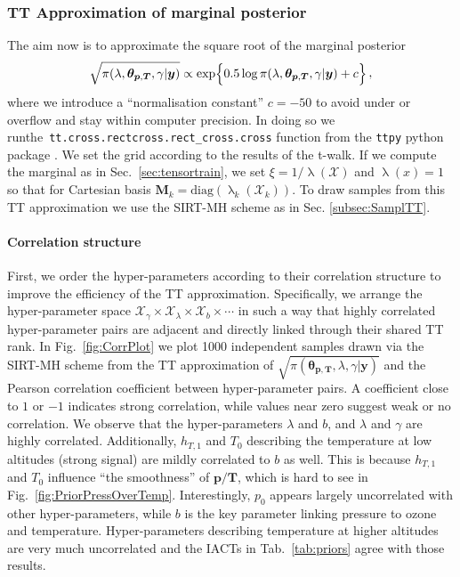 \subsubsection{TT Approximation of marginal posterior}
The aim now is to approximate the square root of the marginal posterior
\begin{align}
	\begin{split}
		\sqrt{\pi( \lambda,\bm{\theta}_{\bm{p}, \bm{T}},\gamma  | \bm{y})} \propto  \exp\Bigl\{ 0.5\log{\pi( \lambda,\bm{\theta}_{\bm{p}, \bm{T}},\gamma  | \bm{y}) } + c \Bigr\}  
	\end{split} \, ,
	\label{eq:MargPostFullTT}
\end{align}
where we introduce a ``normalisation constant'' $c=-50$ to avoid under or overflow and stay within computer precision.
In doing so we run\linebreak the~\texttt{tt.cross.rectcross.rect\_cross.cross} function from the \texttt{ttpy} python package \cite{Oseledets2018ttpy}.
We set the grid according to the results of the t-walk.
If we compute the marginal as in Sec.~\ref{sec:tensortrain}, we set $\xi = 1 / \uplambda (\mathcal{X})$ and $\uplambda(x) = 1$ so that for Cartesian basis $\bm{M}_k = \text{diag}(\uplambda_k(\mathcal{X}_k))$.
To draw samples from this TT approximation we use the SIRT-MH scheme as in Sec. \ref{subsec:SamplTT}.


\paragraph{Correlation structure}
First, we order the hyper-parameters according to their correlation structure to improve the efficiency of the TT approximation. 
Specifically, we arrange the hyper-parameter space $\mathcal{X}_{\gamma} \times \mathcal{X}_{\lambda} \times \mathcal{X}_{b} \times \cdots$ in such a way that highly correlated hyper-parameter pairs are adjacent and directly linked through their shared TT rank.
In Fig.~\ref{fig:CorrPlot} we plot 1000 independent samples drawn via the SIRT-MH scheme from the TT approximation of $\sqrt{\pi( \bm{\theta}_{\bm{p}, \bm{T}},\lambda,\gamma  | \bm{y})}$ and the Pearson correlation coefficient between hyper-parameter pairs.
A coefficient close to $1$ or $-1$ indicates strong correlation, while values near zero suggest weak or no correlation.
We observe that the hyper-parameters $\lambda$ and $b$, and $\lambda$ and $\gamma$ are highly correlated.
Additionally, $h_{T,1}$ and $T_0$ describing the temperature at low altitudes (strong signal) are mildly correlated to $b$ as well.
This is because $h_{T,1}$ and $T_0$ influence ``the smoothness'' of $\bm{p}/\bm{T}$, which is hard to see in Fig.~\ref{fig:PriorPressOverTemp}.
Interestingly, $p_0$ appears largely uncorrelated with other hyper-parameters, while $b$ is the key parameter linking pressure to ozone and temperature.
Hyper-parameters describing temperature at higher altitudes are very much uncorrelated and the IACTs in Tab.~\ref{tab:priors} agree with those results.


